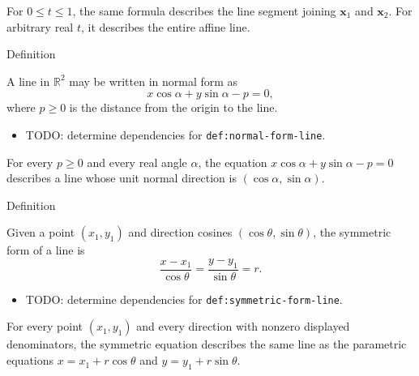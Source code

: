 \begin{remark*}[Interpretation]
For $0\le t\le 1$, the same formula describes the line segment joining
$\mathbf x_1$ and $\mathbf x_2$. For arbitrary real $t$, it describes the
entire affine line.
\end{remark*}

\begin{definitionbox}{Definition}
\begin{definition}
\label{def:normal-form-line}
A line in $\mathbb{R}^2$ may be written in normal form as
\[
  x\cos\alpha+y\sin\alpha-p=0,
\]
where $p\ge 0$ is the distance from the origin to the line.
\end{definition}
\end{definitionbox}

\begin{dependencies}
\begin{itemize}
  \item TODO: determine dependencies for \texttt{def:normal-form-line}.
\end{itemize}
\end{dependencies}

\begin{remark*}
For every $p\ge 0$ and every real angle $\alpha$, the equation
$x\cos\alpha+y\sin\alpha-p=0$ describes a line whose unit normal direction is
$(\cos\alpha,\sin\alpha)$.
\end{remark*}

\begin{definitionbox}{Definition}
\begin{definition}
\label{def:symmetric-form-line}
Given a point $(x_1,y_1)$ and direction cosines
$(\cos\theta,\sin\theta)$, the symmetric form of a line is
\[
  \frac{x-x_1}{\cos\theta}
  =
  \frac{y-y_1}{\sin\theta}
  =
  r.
\]
\end{definition}
\end{definitionbox}

\begin{dependencies}
\begin{itemize}
  \item TODO: determine dependencies for \texttt{def:symmetric-form-line}.
\end{itemize}
\end{dependencies}

\begin{remark*}
For every point $(x_1,y_1)$ and every direction with nonzero displayed
denominators, the symmetric equation describes the same line as the
parametric equations
$x=x_1+r\cos\theta$ and $y=y_1+r\sin\theta$.
\end{remark*}
